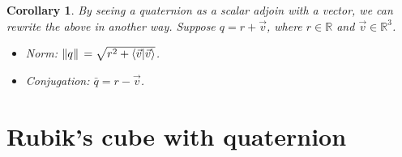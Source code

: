 \documentclass[12pt]{article}
\newtheorem*{corollary}{Corollary}
\begin{document}
    \begin{corollary}
        By seeing a quaternion as a scalar adjoin with a vector, we can rewrite the above in another way. Suppose $q=r+\vec{v}$, where $r\in \mathbb{R}$ and $\vec{v}\in\mathbb{R}^3$. \begin{itemize}
            \item Norm: $\norm*{q}=\sqrt{r^2+\innerproduct{\vec{v}}{\vec{v}}}$.
            \item Conjugation: $\bar{q}=r-\vec{v}$.
        \end{itemize}
    \end{corollary}

    \section{Rubik's cube with quaternion}
\end{document}
